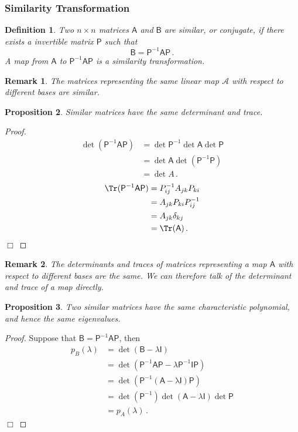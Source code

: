 \documentclass{article}
\theoremstyle{plain}\theoremheaderfont{\normalfont\itshape}\theorembodyfont{\rmfamily}\theoremseparator{.}\newtheorem*{rem}{Remark}\newtheorem*{ex}{Example}\newtheorem*{proof}{Proof}\newtheorem*{altp}{Alternative proof}
\theoremstyle{plain}\theoremheaderfont{\normalfont\bfseries}\theorembodyfont{\rmfamily}\theoremseparator{.}\newtheorem{thm}{Theorem}[section]\newtheorem{lem}[thm]{Lemma}\newtheorem{prop}[thm]{Proposition}\newtheorem*{cor}{Corollary}\newtheorem{defn}[thm]{Definition}\newtheorem{clm}[thm]{Claim}\newtheorem{clminproof}{Claim}
\theoremstyle{break}\theoremheaderfont{\normalfont\itshape}\theorembodyfont{\rmfamily}\theoremseparator{.\medskip}\newtheorem*{proofskip}{Proof}\newtheorem*{exs}{Examples}\newtheorem*{rems}{Remarks}
\theoremstyle{break}\theoremheaderfont{\normalfont\bfseries}\theorembodyfont{\rmfamily}\theoremseparator{.\medskip}\newtheorem{lemskip}[thm]{Lemma}\newtheorem{defnskip}[thm]{Definition}\newtheorem{propskip}[thm]{Proposition}\newtheorem{thmskip}[thm]{Theorem}
\numberwithin{equation}{section}
\newcommand{\qed}{\hfill\ensuremath{\Box}}
\begin{document}
	\subsubsection{Similarity Transformation}
	\begin{defn}
		Two \(n\times n\) matrices \(\mathsf{A}\) and \(\mathsf{B}\) are \textit{similar}, or \textit{conjugate}, if there exists a invertible matrix \(\mathsf{P}\) such that
		\[\mathsf{B}=\mathsf{P}^{-1}\mathsf{AP}\,.\]
		A map from \(\mathsf{A}\) to \(\mathsf{P}^{-1}\mathsf{AP}\) is a \textit{similarity transformation}.
	\end{defn}
	\begin{rem}
		The matrices representing the same linear map \(\mathcal{A}\) with respect to different bases are similar.
	\end{rem}
	\begin{prop}
		Similar matrices have the same determinant and trace.
	\end{prop}
	\begin{proof}
		\begin{align*}
			\det(\mathsf{P}^{-1}\mathsf{AP})&=\det\mathsf{P}^{-1}\det\mathsf{A}\det\mathsf{P}\\
			&=\det\mathsf{A}\det(\mathsf{P}^{-1}\mathsf{P})\\
			&=\det A\,.
		\end{align*}
		\begin{align*}
			\Tr(\mathsf{P}^{-1}\mathsf{AP})&=P_{ij}^{-1}A_{jk}P_{ki}\\
			&=A_{jk}P_{ki}P_{ij}^{-1}\\
			&=A_{jk}\delta_{kj}\\
			&=\Tr(\mathsf{A})\,.
		\end{align*}\qed
	\end{proof}
	\begin{rem}
		The determinants and traces of matrices representing a map \(\mathsf{A}\) with respect to different bases are the same. We can therefore talk of the determinant and trace of a map directly.
	\end{rem}
	\begin{prop}
		Two similar matrices have the same characteristic polynomial, and hence the same eigenvalues.
	\end{prop}
	\begin{proof}
		Suppose that \(\mathsf{B}=\mathsf{P}^{-1}\mathsf{AP}\), then
		\begin{align*}
			p_B(\lambda)&=\det(\mathsf{B}-\lambda\mathsf{I})\\
			&=\det(\mathsf{P}^{-1}\mathsf{AP}-\lambda\mathsf{P}^{-1}\mathsf{IP})\\
			&=\det(\mathsf{P}^{-1}\mathsf{(A-\mathrm{\lambda}I)P})\\
			&=\det(\mathsf{P}^{-1})\det(\mathsf{A}-\lambda\mathsf{I})\det\mathsf{P}\\
			&=p_A(\lambda)\,.
		\end{align*}\qed
	\end{proof}
\end{document}
